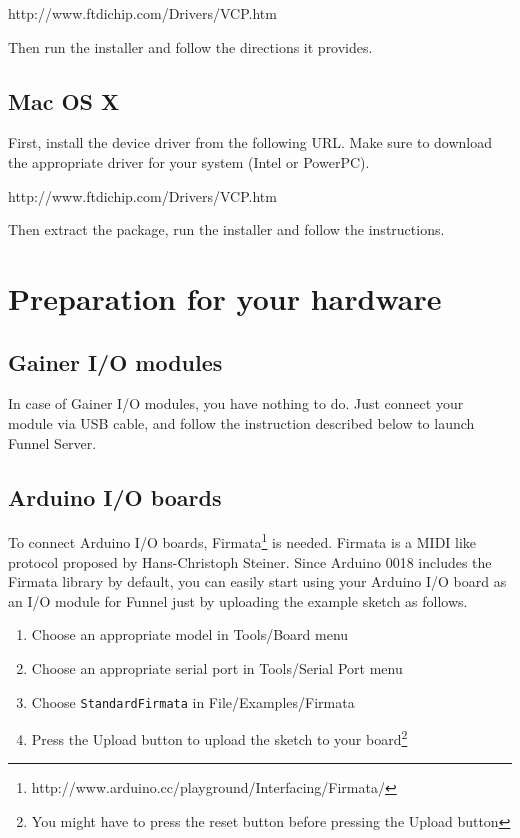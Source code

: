 \documentclass[9pt]{jsarticle}
\begin{document}
\vspace{8pt}
http://www.ftdichip.com/Drivers/VCP.htm
\vspace{8pt}

Then run the installer and follow the directions it provides.

\subsection{Mac OS X}
First, install the device driver from the following URL. Make sure to download the appropriate driver for your system (Intel or PowerPC).

\vspace{8pt}
http://www.ftdichip.com/Drivers/VCP.htm
\vspace{8pt}

Then extract the package, run the installer and follow the instructions.

\section{Preparation for your hardware}
\subsection{Gainer I/O modules}
In case of Gainer I/O modules, you have nothing to do. Just connect your module via USB cable, and follow the instruction described below to launch Funnel Server.

\subsection{Arduino I/O boards}
\label{uploading_firmata_arduino}
To connect Arduino I/O boards, Firmata\footnote{http://www.arduino.cc/playground/Interfacing/Firmata/} is needed. Firmata is a MIDI like protocol proposed by Hans-Christoph Steiner. Since Arduino 0018 includes the Firmata library by default, you can easily start using your Arduino I/O board as an I/O module for Funnel just by uploading the example sketch as follows.

\begin{enumerate}
\item Choose an appropriate model in Tools/Board menu
\item Choose an appropriate serial port in Tools/Serial Port menu
\item Choose \texttt{StandardFirmata} in File/Examples/Firmata
\item Press the Upload button to upload the sketch to your board\footnote{You might have to press the reset button before pressing the Upload button}
\end{enumerate}
\end{document}
